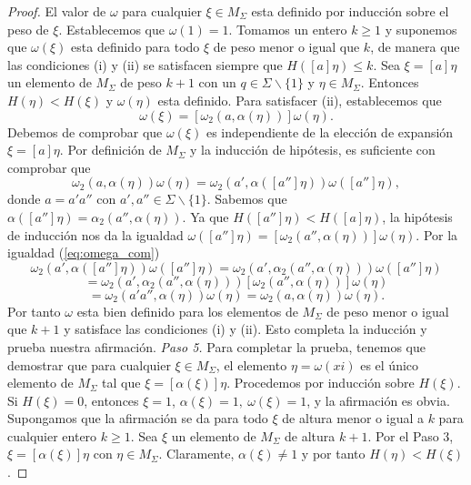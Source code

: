 \documentclass[12pt]{book}
\theoremstyle{definition}
\begin{document}
\begin{proof}
El valor de $\omega$ para cualquier $\xi\in M_\Sigma$ esta definido por inducción sobre el peso de $\xi$. Establecemos que $\omega(1)=1$. Tomamos un entero $k\geq 1$ y suponemos que $\omega(\xi)$ esta definido para todo $\xi$ de peso menor o igual que $k$, de manera que las condiciones (i) y (ii) se satisfacen siempre que $H([a]\eta)\leq k$. Sea $\xi=[a]\eta$ un elemento de $M_\Sigma$ de peso $k+1$ con un $q\in\Sigma \backslash \{1\}$ y $\eta\in M_\Sigma$. Entonces $H(\eta)< H(\xi)$ y $\omega(\eta)$ esta definido. Para satisfacer (ii), establecemos que 
$$\omega(\xi)=[\omega_2(a,\alpha(\eta))]\omega(\eta).$$
Debemos de comprobar que $\omega(\xi)$ es independiente de la elección de expansión $\xi=[a]\eta$. Por definición de $M_\Sigma$ y la inducción de hipótesis, es suficiente con comprobar que
$$\omega_2(a,\alpha(\eta))\omega(\eta)=\omega_2(a',\alpha([a'']\eta))\omega([a'']\eta),$$
donde $a=a'a''$ con $a',a''\in\Sigma\backslash\{1\}$. Sabemos que $\alpha([a'']\eta)=\alpha_2(a'',\alpha(\eta))$. Ya que $H([a'']\eta) < H([a]\eta)$, la hipótesis de inducción nos da la igualdad $\omega([a'']\eta)=[\omega_2(a'',\alpha(\eta))]\omega(\eta)$. Por la igualdad (\ref{eq:omega_com})
$$\omega_2(a',\alpha([a'']\eta))\omega([a'']\eta)=\omega_2(a',\alpha_2(a'',\alpha(\eta)))\omega([a'']\eta)$$
$$= \omega_2(a',\alpha_2(a'',\alpha(\eta)))[\omega_2(a'',\alpha(\eta))]\omega(\eta)$$
$$ =\omega_2(a'a'',\alpha(\eta))\omega(\eta)=  \omega_2(a,\alpha(\eta))\omega(\eta).$$
Por tanto $\omega$ esta bien definido para los elementos de $M_\Sigma$ de peso menor o igual que $k+1$ y satisface las condiciones (i) y (ii). Esto completa la inducción y prueba nuestra afirmación.
\newline
\newline
\textit{Paso 5.} Para completar la prueba, tenemos que demostrar que para cualquier $\xi\in M_\Sigma$, el elemento $\eta = \omega(xi)$ es el único elemento de $M_\Sigma$ tal que $\xi = [\alpha(\xi)]\eta$. Procedemos por inducción sobre $H(\xi)$. Si $H(\xi) = 0$, entonces $\xi = 1$, $\alpha(\xi) = 1,\ \omega(\xi) = 1$, y la afirmación es obvia. Supongamos que la afirmación se da para todo $\xi$ de altura menor o igual a $k$ para cualquier entero $k\geq 1$. Sea $\xi$ un elemento de $M_\Sigma$ de  altura $k+1$. Por el Paso 3, $\xi=[\alpha(\xi)]\eta$ con $\eta\in M_\Sigma$. Claramente, $\alpha(\xi)\neq 1$ y por tanto $H(\eta) < H(\xi)$.


\end{proof}
\end{document}
